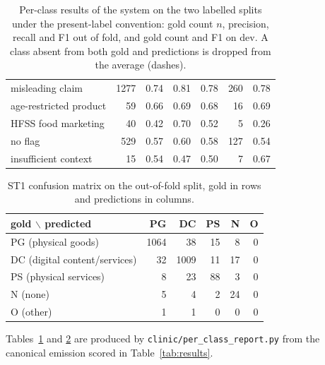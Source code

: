 \documentclass[11pt]{article}
\newcommand{\lab}[1]{\texttt{\small #1}}
\begin{document}
\begin{table}[t]
\begin{tabular}{@{}lrrrrrr@{}}
misleading claim & 1277 & 0.74 & 0.81 & 0.78 & 260 & 0.78 \\
age-restricted product & 59 & 0.66 & 0.69 & 0.68 & 16 & 0.69 \\
HFSS food marketing & 40 & 0.42 & 0.70 & 0.52 & 5 & 0.26 \\
no flag & 529 & 0.57 & 0.60 & 0.58 & 127 & 0.54 \\
insufficient context & 15 & 0.54 & 0.47 & 0.50 & 7 & 0.67 \\
\bottomrule
\end{tabular}
\caption{Per-class results of the system on the two labelled splits under the present-label
convention: gold count $n$, precision, recall and F1 out of fold, and gold count and F1 on
dev. A class absent from both gold and predictions is dropped from the average (dashes).}
\label{tab:perclass}
\end{table}

\begin{table}[t]
\centering\footnotesize
\setlength{\tabcolsep}{4pt}
\begin{tabular}{@{}lrrrrr@{}}
\toprule
gold $\backslash$ predicted & PG & DC & PS & N & O \\
\midrule
PG (physical goods) & 1064 & 38 & 15 & 8 & 0 \\
DC (digital content/services) & 32 & 1009 & 11 & 17 & 0 \\
PS (physical services) & 8 & 23 & 88 & 3 & 0 \\
N (none) & 5 & 4 & 2 & 24 & 0 \\
O (other) & 1 & 1 & 0 & 0 & 0 \\
\bottomrule
\end{tabular}
\caption{ST1 confusion matrix on the out-of-fold split, gold in rows and predictions in
columns.}
\label{tab:confusion}
\end{table}

Tables~\ref{tab:perclass} and \ref{tab:confusion} are produced by
\lab{clinic/per\_class\_report.py} from the canonical emission scored in
Table~\ref{tab:results}.
\end{document}
